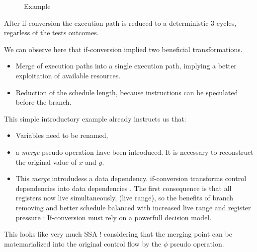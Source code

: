 \begin{figure}
\caption{Example}
\label{fig:example1}
\end{figure}

After if-conversion the execution path is reduced to a deterministic 3 cycles, regarless of the tests outcomes. 

We can observe here that if-conversion implied two beneficial transformations.
\begin{itemize}
\item  Merge of execution paths into a single execution path, implying a  better exploitation of available resources.  
\item Reduction of the schedule length, because instructions can be speculated before the branch.
\end{itemize}

This simple introductory example already instructs us that:

\begin{itemize}
\item Variables need to be renamed, 
\item a \textit{merge} pseudo operation have been introduced. It is necessary to reconstruct the original value of $x$ and $y$.
\item This \textit{merge} introdudess a data dependency. if-conversion transforms control dependencies into data dependencies \cite{Allen:1983:CCD:567067.567085}. The first consequence is that all registers now live simultaneously, (live range), so the benefits of branch removing and better schedule balanced with increased live range and register pressure : If-conversion must rely on a powerfull decision model.
\end{itemize}
This looks like very much SSA ! considering that the merging point can be matemarialized into the original control flow by the $\phi$ pseudo operation.


